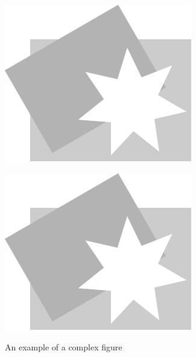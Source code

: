 \documentclass{superfri}
\begin{document}
\begin{figure}[!ht]
	\begin{minipage}{.5\linewidth}
		\centering
		\includegraphics[width=0.65\linewidth]{pic/pic}
		\label{subfig:a}
	\end{minipage}
	\begin{minipage}{.5\linewidth}
		\centering
		\includegraphics[width=0.65\linewidth]{pic/pic}
		\label{subfig:b}
	\end{minipage}
	\vspace{3pt}
	\caption{An example of a complex figure}
	\label{fig:fig}
\end{figure}


\end{document}
